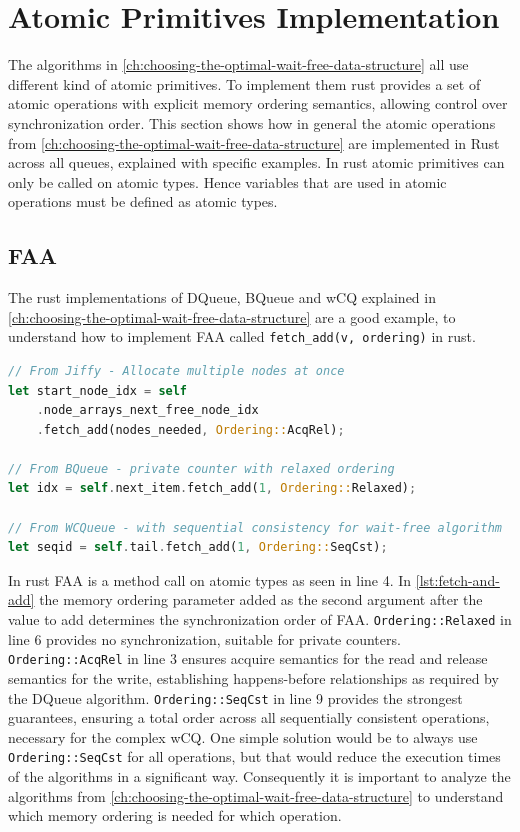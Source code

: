 \section{Atomic Primitives Implementation}

The algorithms in \cref{ch:choosing-the-optimal-wait-free-data-structure} all use different kind of atomic primitives. To implement them rust provides a set of atomic operations with explicit memory ordering semantics, allowing control over synchronization order. This section shows how in general the atomic operations from \cref{ch:choosing-the-optimal-wait-free-data-structure} are implemented in Rust across all queues, explained with specific examples. In rust atomic primitives can only be called on atomic types. Hence variables that are used in atomic operations must be defined as atomic types.

\subsection{\acf{FAA}}

The rust implementations of DQueue, BQueue and \ac{wCQ} explained in \cref{ch:choosing-the-optimal-wait-free-data-structure} are a good example, to understand how to implement \ac{FAA} called \texttt{fetch\_add(v, ordering)} in rust.

\begin{lstlisting}[language=Rust, style=boxed, caption={Fetch-and-add with different memory orderings}, label={lst:fetch-and-add}]
// From Jiffy - Allocate multiple nodes at once
let start_node_idx = self
    .node_arrays_next_free_node_idx
    .fetch_add(nodes_needed, Ordering::AcqRel);

// From BQueue - private counter with relaxed ordering
let idx = self.next_item.fetch_add(1, Ordering::Relaxed);

// From WCQueue - with sequential consistency for wait-free algorithm
let seqid = self.tail.fetch_add(1, Ordering::SeqCst);
\end{lstlisting}

In rust \ac{FAA} is a method call on atomic types as seen in line 4. In \cref{lst:fetch-and-add} the memory ordering parameter added as the second argument after the value to add determines the synchronization order of \ac{FAA}. \texttt{Ordering::Relaxed} in line 6 provides no synchronization, suitable for private counters. \texttt{Ordering::AcqRel} in line 3 ensures acquire semantics for the read and release semantics for the write, establishing happens-before relationships as required by the DQueue algorithm. \texttt{Ordering::SeqCst} in line 9 provides the strongest guarantees, ensuring a total order across all sequentially consistent operations, necessary for the complex \ac{wCQ}. One simple solution would be to always use \texttt{Ordering::SeqCst} for all operations, but that would reduce the execution times of the algorithms in a significant way. Consequently it is important to analyze the algorithms from \cref{ch:choosing-the-optimal-wait-free-data-structure} to understand which memory ordering is needed for which operation.


